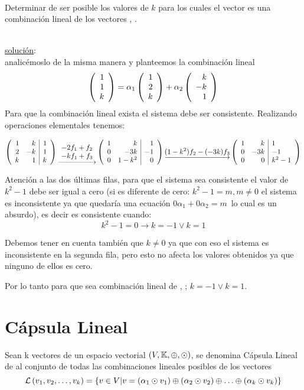 ~\\
\begin{ejercicio}
Determinar de ser posible los valores de $k$ para los cuales el vector 
 es una combinación lineal de los vectores
 , .
\end{ejercicio}
~\\
\underline{solución}:
\\
analicémoslo de la misma manera y planteemos la combinación lineal
\[
\vectrtres{1}{1}{k}=
 \alpha_1\vectrtres{1}{2}{k}+\alpha_2\vectrtres{k}{-k}{1}
\]
Para que la combinación lineal exista el sistema debe ser consistente. Realizando operaciones elementales tenemos:

\[
\reducir{rr|r}{
1 &k&1\\
2&-k&1\\
k&1&k
}
\underrightarrow{\begin{array}{c}
    -2f_1 + f_2\\
    -kf_1 + f_3 
\end{array}}
\reducir{rr|r}{
1 &k&1\\
0&-3k&-1\\
0&1-k^2&0
}
\underrightarrow{(1-k^2)f_2 - (-3k)f_3 }
\reducir{rr|l}{
1 &k&1\\
0&-3k&-1\\
0&0&k^2-1
}
\]

Atención a las dos últimas filas, para que el sistema sea consistente el valor de $k^2-1$ debe ser igual a cero (si es diferente de cero: $k^2-1=m, m\neq 0$ el sistema es inconsistente ya que quedar\'ia una ecuación $0\alpha_1+0\alpha_2=m$\, lo cual es un absurdo), es decir es consistente cuando:
\[k^2-1=0  \longrightarrow  k=-1 \vee k=1\]

Debemos tener en cuenta también que $k\neq 0$
ya que con eso el sistema es inconsistente en la
segunda fila, pero esto no afecta los valores obtenidos ya que ninguno de ellos es cero.


Por lo tanto para que  sea combinación lineal de , ; $k=-1 \vee k=1$.

\newpage
\section{Cápsula Lineal}
\begin{dfn}
Sean  k vectores de un espacio vectorial $(V,\dobleK,\oplus,\odot)$, se denomina Cápsula Lineal de  al conjunto de todas las combinaciones lineales posibles de los vectores 
\[
\mathcal{L} \left(\kvect{v}{k}\right)=
\lbrace v \in V|v= \av{}{\alpha_1 \odot v_1} \oplus
\av{}{\alpha_2 \odot v_2} \oplus 
\hdots \oplus
\av{}{\alpha_k \odot v_k}
\rbrace
\]

\end{dfn}

